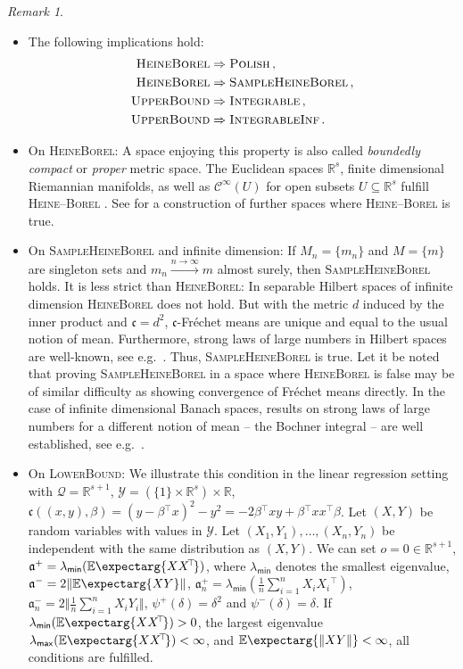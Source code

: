 \documentclass{scrartcl}
\renewcommand{\subset}{\subseteq}
\newcommand{\Ex}{\E\expectarg}
\newcommand*{\mc}[1]{\mathcal{#1}}
\newcommand*{\ms}[1]{\mathsf{#1}}
\newcommand*{\mf}[1]{\mathfrak{#1}}
\newcommand{\R}{\mathbb{R}}
\newcommand{\transpose}{\!^\top\!}
\newcommand{\tr}{\transpose}
\newcommand{\normof}[1]{\Vert #1 \Vert}
\newcommand{\equationFullstop}{\, .}
\newcommand{\eqfs}{\equationFullstop}
\newcommand{\equationComma}{\, ,}
\newcommand{\eqcm}{\equationComma}
\theoremstyle{plain}\newtheorem{theorem}{Theorem}[section]
\theoremstyle{definition}
\theoremstyle{remark}
\newtheorem{remark}[theorem]{Remark}
\begin{document}
\begin{remark}\label{rem:on_ass1}\mbox{ }
\begin{itemize}
\item 
	The following implications hold:
	\begin{align*}
	\textsc{HeineBorel} &\Rightarrow \textsc{Polish}\eqcm\\
	\textsc{HeineBorel} &\Rightarrow \textsc{SampleHeineBorel}\eqcm\\
	\textsc{UpperBound} &\Rightarrow \textsc{Integrable}\eqcm\\
	\textsc{UpperBound} &\Rightarrow \textsc{IntegrableInf}\eqfs
	\end{align*}
\item On \textsc{HeineBorel}:
	A space enjoying this property is also called \textit{boundedly compact} or \textit{proper} metric space.
	The Euclidean spaces $\R^s$, finite dimensional Riemannian manifolds, as well as $\mc C^\infty(U)$ for open subsets $U \subset \R^s$  fulfill \textsc{Heine--Borel} \cite[section 8.4.7]{edwards95}.
	See \cite{williamson87} for a construction of further spaces where \textsc{Heine--Borel} is true. 
\item On \textsc{SampleHeineBorel} and infinite dimension:
	If $M_n=\{m_n\}$ and $M=\{m\}$ are singleton sets and $m_n \xrightarrow{n\to\infty} m$ almost surely, then \textsc{SampleHeineBorel} holds. It is less strict than \textsc{HeineBorel}: In separable Hilbert spaces of infinite dimension \textsc{HeineBorel} does not hold. But with the metric $d$ induced by the inner product and $\mf c=d^2$, $\mf c$-Fréchet means are unique and equal to the usual notion of mean. Furthermore, strong laws of large numbers in Hilbert spaces are well-known, see e.g.\ \cite{kawabe86}. Thus, \textsc{SampleHeineBorel} is true. Let it be noted that proving \textsc{SampleHeineBorel} in a space where \textsc{HeineBorel} is false may be of similar difficulty as showing convergence of Fréchet means directly. In the case of infinite dimensional Banach spaces, results on strong laws of large numbers for a different notion of mean -- the Bochner integral -- are well established, see e.g.\ \cite{hoffmann76}.
\item On \textsc{LowerBound}:
	We illustrate this condition in the linear regression setting with $\mc Q = \R^{s+1}$, $\mc Y = (\{1\}\times\R^s) \times \R$, $\mf c((x,y),\beta) = (y - \beta\tr x)^2 - y^2 = - 2 \beta\tr x y + \beta\tr xx\tr \beta$. Let $(X, Y)$ be random variables with values in $\mc Y$. Let $(X_1, Y_1),\dots, (X_n, Y_n)$ be independent with the same distribution as $(X,Y)$. We can set $o = 0\in\R^{s+1}$, $\mf a^+ = \lambda_{\ms{min}}(\Ex{XX\tr})$, where $\lambda_{\ms{min}}$ denotes the smallest eigenvalue, $\mf a^- = 2 \normof{\Ex{XY}}$, $\mf a^+_n = \lambda_{\ms{min}}(\frac1n \sum_{i=1}^n X_iX_i\tr)$, $\mf a^-_n = 2 \normof{\frac1n\sum_{i=1}^n X_iY_i}$, $\psi^+(\delta) = \delta^2$ and $\psi^-(\delta) = \delta$. If $\lambda_{\ms{min}}(\Ex{XX\tr}) > 0$, the largest eigenvalue $\lambda_{\ms{max}}(\Ex{XX\tr}) < \infty$, and $\Ex{\normof{XY}} < \infty$, all conditions are fulfilled.
	

\end{itemize}
\end{remark}
\end{document}
